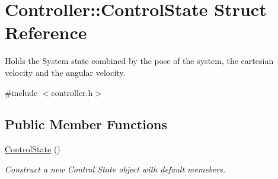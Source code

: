 \hypertarget{structController_1_1ControlState}{}\section{Controller\+:\+:Control\+State Struct Reference}
\label{structController_1_1ControlState}


Holds the System state combined by the pose of the system, the cartesian velocity and the angular velocity.  




{\ttfamily \#include $<$controller.\+h$>$}

\subsection*{Public Member Functions}
\begin{DoxyCompactItemize}
\item 
\hyperlink{structController_1_1ControlState_a796d0aa1a726976960e68a9e4a81f535}{Control\+State} ()\hypertarget{structController_1_1ControlState_a796d0aa1a726976960e68a9e4a81f535}{}\label{structController_1_1ControlState_a796d0aa1a726976960e68a9e4a81f535}

\begin{DoxyCompactList}\small\item\em Construct a new Control State object with default memebers. \end{DoxyCompactList}\end{DoxyCompactItemize}
